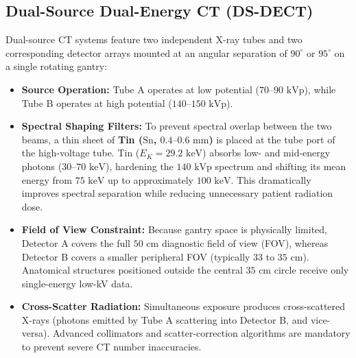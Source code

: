 \documentclass[11pt,a4paper]{article}
\begin{document}
\subsection{Dual-Source Dual-Energy CT (DS-DECT)}
Dual-source CT systems feature two independent X-ray tubes and two corresponding detector arrays mounted at an angular separation of $90^\circ$ or $95^\circ$ on a single rotating gantry:
\begin{itemize}[leftmargin=2em]
    \item \textbf{Source Operation:} Tube A operates at low potential ($70\text{--}90\text{ kVp}$), while Tube B operates at high potential ($140\text{--}150\text{ kVp}$).
    \item \textbf{Spectral Shaping Filters:} To prevent spectral overlap between the two beams, a thin sheet of \textbf{Tin ($\text{Sn}$, $0.4\text{--}0.6\text{ mm}$)} is placed at the tube port of the high-voltage tube. Tin ($E_K = 29.2\text{ keV}$) absorbs low- and mid-energy photons ($30\text{--}70\text{ keV}$), hardening the $140\text{ kVp}$ spectrum and shifting its mean energy from $75\text{ keV}$ up to approximately $100\text{ keV}$. This dramatically improves spectral separation while reducing unnecessary patient radiation dose.
    \item \textbf{Field of View Constraint:} Because gantry space is physically limited, Detector A covers the full $50\text{ cm}$ diagnostic field of view (FOV), whereas Detector B covers a smaller peripheral FOV (typically $33\text{ to }35\text{ cm}$). Anatomical structures positioned outside the central $35\text{ cm}$ circle receive only single-energy low-kV data.
    \item \textbf{Cross-Scatter Radiation:} Simultaneous exposure produces cross-scattered X-rays (photons emitted by Tube A scattering into Detector B, and vice-versa). Advanced collimators and scatter-correction algorithms are mandatory to prevent severe CT number inaccuracies.
\end{itemize}
\end{document}
